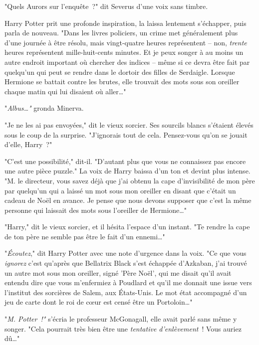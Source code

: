 "Quels Aurors sur l'enquête~?" dit Severus d'une voix sans timbre.

Harry Potter prit une profonde inspiration, la laissa lentement s'échapper, puis parla de nouveau. "Dans les livres policiers, un crime met généralement plus d'une journée à être résolu, mais vingt-quatre heures représentent -- non, \emph{trente} heures représentent mille-huit-cents minutes. Et je peux songer à au moins un autre endroit important où chercher des indices -- même si ce devra être fait par quelqu'un qui peut se rendre dans le dortoir des filles de Serdaigle. Lorsque Hermione se battait contre les brutes, elle trouvait des mots sous son oreiller chaque matin qui lui disaient où aller…"

"\emph{Albus…"} gronda Minerva.

"Je ne les ai pas envoyées," dit le vieux sorcier. Ses sourcils blancs s'étaient élevés sous le coup de la surprise. "J'ignorais tout de cela. Pensez-vous qu'on se jouait d'elle, Harry~?"

"C'est une possibilité," dit-il. "D'autant plus que vous ne connaissez pas encore une autre pièce puzzle." La voix de Harry baissa d'un ton et devint plus intense. "M. le directeur, vous savez déjà que j'ai obtenu la cape d'invisibilité de mon père par quelqu'un qui a laissé un mot sous mon oreiller en disant que c'était un cadeau de Noël en avance. Je pense que nous devons supposer que c'est la même personne qui laissait des mots sous l'oreiller de Hermione…"

"Harry," dit le vieux sorcier, et il hésita l'espace d'un instant. "Te rendre la cape de ton père ne semble pas être le fait d'un ennemi…"

"\emph{Écoutez}," dit Harry Potter avec une note d'urgence dans la voix. "Ce que vous \emph{ignorez} c'est qu'après que Bellatrix Black s'est échappée d'Azkaban, j'ai trouvé un autre mot sous mon oreiller, signé 'Père Noël', qui me disait qu'il avait entendu dire que vous m'enfermiez à Poudlard et qu'il me donnait une issue vers l'institut des sorcières de Salem, aux États-Unis. Le mot état accompagné d'un jeu de carte dont le roi de cœur est censé être un Portoloin…"

"\emph{M. Potter~!"} s'écria le professeur McGonagall, elle avait parlé sans même y songer. "Cela pourrait très bien être une \emph{tentative d'enlèvement}~! Vous auriez dû…"

